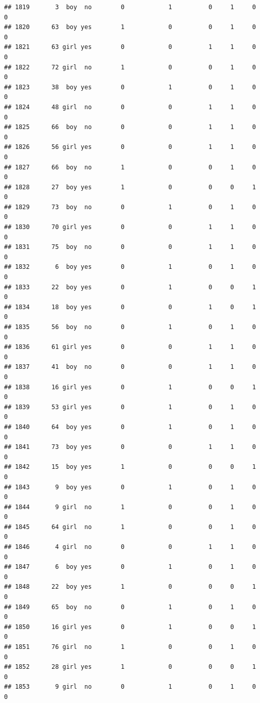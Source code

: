 \documentclass[man]{apa6}
\begin{document}
\begin{verbatim}
## 1819       3  boy  no        0            1          0     1     0     0
## 1820      63  boy yes        1            0          0     1     0     0
## 1821      63 girl yes        0            0          1     1     0     0
## 1822      72 girl  no        1            0          0     1     0     0
## 1823      38  boy yes        0            1          0     1     0     0
## 1824      48 girl  no        0            0          1     1     0     0
## 1825      66  boy  no        0            0          1     1     0     0
## 1826      56 girl yes        0            0          1     1     0     0
## 1827      66  boy  no        1            0          0     1     0     0
## 1828      27  boy yes        1            0          0     0     1     0
## 1829      73  boy  no        0            1          0     1     0     0
## 1830      70 girl yes        0            0          1     1     0     0
## 1831      75  boy  no        0            0          1     1     0     0
## 1832       6  boy yes        0            1          0     1     0     0
## 1833      22  boy yes        0            1          0     0     1     0
## 1834      18  boy yes        0            0          1     0     1     0
## 1835      56  boy  no        0            1          0     1     0     0
## 1836      61 girl yes        0            0          1     1     0     0
## 1837      41  boy  no        0            0          1     1     0     0
## 1838      16 girl yes        0            1          0     0     1     0
## 1839      53 girl yes        0            1          0     1     0     0
## 1840      64  boy yes        0            1          0     1     0     0
## 1841      73  boy yes        0            0          1     1     0     0
## 1842      15  boy yes        1            0          0     0     1     0
## 1843       9  boy yes        0            1          0     1     0     0
## 1844       9 girl  no        1            0          0     1     0     0
## 1845      64 girl  no        1            0          0     1     0     0
## 1846       4 girl  no        0            0          1     1     0     0
## 1847       6  boy yes        0            1          0     1     0     0
## 1848      22  boy yes        1            0          0     0     1     0
## 1849      65  boy  no        0            1          0     1     0     0
## 1850      16 girl yes        0            1          0     0     1     0
## 1851      76 girl  no        1            0          0     1     0     0
## 1852      28 girl yes        1            0          0     0     1     0
## 1853       9 girl  no        0            1          0     1     0     0

\end{verbatim}
\end{document}
